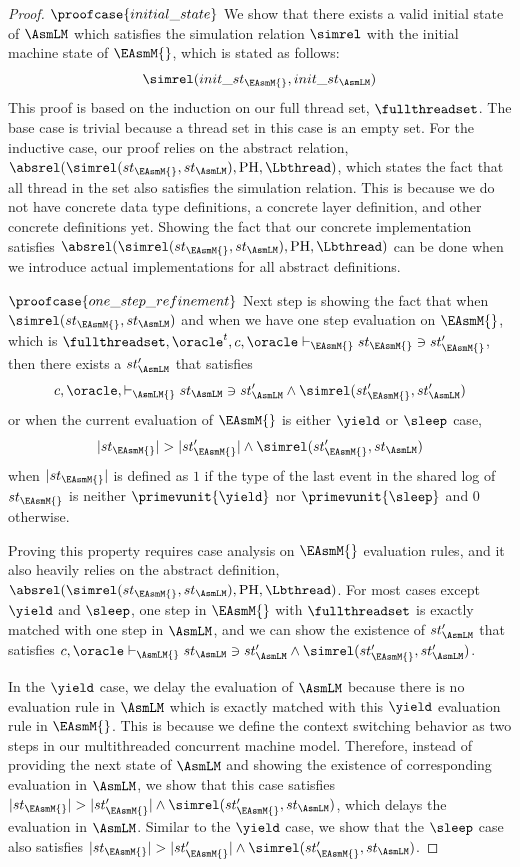\begin{proof} $\proofcase{initial\_state}$ We show that there exists a valid initial state of $\AsmLM$ which satisfies the simulation relation
$\simrel$ with the initial machine state of $\EAsmM{}$, which is stated as follows:
$$\simrel(init\_st_{\EAsmM{}}, init\_st_{\AsmLM})$$
This proof is based on the induction on our full thread set, $\fullthreadset$. 
The base case is trivial because a thread set in this case is an empty set.
For the inductive case, our proof relies on the abstract relation, $\absrel(\simrel(st_{\EAsmM{}}, st_{\AsmLM}), \mathrm{PH}, \Lbthread)$, which states the fact that
 all thread in the set also satisfies the simulation relation. 
This is because we do not have concrete data type definitions, a concrete layer definition, and other concrete definitions yet. 
Showing the fact that our concrete implementation satisfies  $\absrel(\simrel(st_{\EAsmM{}}, st_{\AsmLM}), \mathrm{PH}, \Lbthread)$ can be done when we introduce actual implementations for all abstract definitions.

$\proofcase{one\_step\_refinement}$
Next step is showing the fact that when $\simrel(st_{\EAsmM{}}, st_{\AsmLM})$ and when we have one step evaluation on $\EAsmM{}$, which is $\fullthreadset, \oracle^t, c, \oracle  \vdash_{\EAsmM{}} st_{\EAsmM{}} \ni st'_{\EAsmM{}} $, 
then there exists a $st'_{\AsmLM}$ that satisfies 
$$c, \oracle, \vdash_{\AsmLM{}} st_{\AsmLM} \ni st'_{\AsmLM} \wedge \simrel(st'_{\EAsmM{}}, st'_{\AsmLM})$$
or when the current evaluation of $\EAsmM{}$ is either $\yield$ or $\sleep$ case, 
$$\vert st_{\EAsmM{}} \vert > \vert st'_{\EAsmM{}} \vert \wedge \simrel(st'_{\EAsmM{}}, st_{\AsmLM})$$
when $\vert st_{\EAsmM{}} \vert$ is defined as $1$ if the type of the last event in the shared log of $st_{\EAsmM{}}$ 
is neither $\primevunit{\yield}$ nor $\primevunit{\sleep}$ and $0$ otherwise.

Proving this property requires case analysis on $\EAsmM{}$ evaluation rules, and it  
also heavily relies on the abstract definition,  $\absrel(\simrel(st_{\EAsmM{}}, st_{\AsmLM}), \mathrm{PH}, \Lbthread)$.
For most cases except $\yield$ and $\sleep$, one step in $\EAsmM{}$ with $\fullthreadset$ 
is exactly matched with one step in $\AsmLM$, and we can show the existence of $st'_{\AsmLM}$ that satisfies 
$c, \oracle\vdash_{\AsmLM{}} st_{\AsmLM} \ni st'_{\AsmLM} \wedge \simrel(st'_{\EAsmM{}}, st'_{\AsmLM})$.

In the $\yield$ case, we delay the evaluation of $\AsmLM$ because there is no evaluation rule in $\AsmLM$
which is exactly matched with this $\yield$ evaluation rule in $\EAsmM{}$. 
This is because we define the context switching behavior 
as two steps in our multithreaded concurrent machine model.
Therefore, instead of providing the next state of $\AsmLM$ and showing the existence of corresponding 
evaluation in $\AsmLM$, 
we show that this 
case satisfies $\vert st_{\EAsmM{}} \vert > \vert st'_{\EAsmM{}} \vert \wedge \simrel(st'_{\EAsmM{}}, st_{\AsmLM})$, 
which delays the evaluation in $\AsmLM$. 
Similar to the $\yield$ case, we show that the $\sleep$ case also 
satisfies $\vert st_{\EAsmM{}} \vert > \vert st'_{\EAsmM{}} \vert \wedge \simrel(st'_{\EAsmM{}}, st_{\AsmLM})$.


\end{proof}
